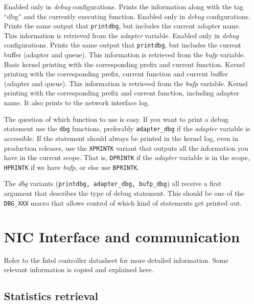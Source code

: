 \documentclass[oneside]{hpman}
\begin{document}
\begin{itemize}
 Enabled only in \textit{debug} configurations. Prints the information along with the tag ``dbg'' and the currently executing function.
 Enabled only in \textit{debug} configurations. Prints the same output that \texttt{printdbg}, but includes the current adapter name. This information is retrieved from the \textit{adapter} variable.
 Enabled only in \textit{debug} configurations. Prints the same output that \texttt{printdbg}, but includes the current buffer (adapter and queue). This information is retrieved from the \textit{bufp} variable.
 Basic kernel printing with the corresponding prefix and current function.
 Kernel printing with the corresponding prefix, current function and current buffer (adapter and queue). This information is retrieved from the \textit{bufp} variable.
 Kernel printing with the corresponding prefix and current function, including adapter name. It also prints to the network interface log.
\end{itemize}

The question of which function to use is easy. If you want to print a debug statement use the \texttt{dbg} functions, preferably \texttt{adapter\_dbg} if the \textit{adapter} variable is accessible. If the statement should always be printed in the kernel log, even in production releases, use the \texttt{XPRINTK} variant that outputs all the information you have in the current scope. That is, \texttt{DPRINTK} if the \textit{adapter} variable is in the scope, \texttt{HPRINTK} if we have \textit{bufp}, or else use \texttt{BPRINTK}.

The \textit{dbg} variants (\texttt{printdbg, adapter\_dbg, bufp\_dbg}) all receive a first argument that describes the type of debug statement. This should be one of the \texttt{DBG\_XXX} macro that allows control of which kind of statements get printed out.



\chapter{NIC Interface and communication}

Refer to the Intel controller datasheet \cite{825992010} for more detailed information. Some relevant information is copied and explained here.

\section{Statistics retrieval}
\end{document}
